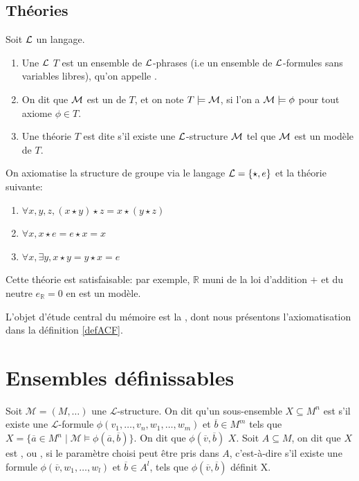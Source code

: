 \subsection{Théories}

\begin{defi}
Soit $\mathcal{L}$ un langage.
\begin{enumerate}
\item Une $\mathcal{L}$ $T$ est un ensemble de $\mathcal{L}$-phrases (i.e un ensemble de $\mathcal{L}$-formules sans variables libres), qu'on appelle .
\item On dit que $\mathcal{M}$ est un  de $T$, et on note $T \models \mathcal{M}$, si l'on a $\mathcal{M} \models \phi$ pour tout axiome $\phi \in T$.
\item Une théorie $T$ est dite  s'il existe une $\mathcal{L}$-structure $\mathcal{M}$ tel que $\mathcal{M}$ est un modèle de $T$.
\end{enumerate}
\end{defi}

\begin{exem}
On axiomatise la structure de groupe via le langage $\mathcal{L} = \{ \star , e \}$ et la théorie suivante:
\begin{enumerate}
\item $\forall x,y,z, (x \star y) \star z = x \star (y \star z)$
\item $\forall x, x \star e = e \star x = x$
\item $\forall x, \exists y, x \star y = y \star x = e$
\end{enumerate}
Cette théorie est satisfaisable: par exemple, $\mathbb{R}$ muni de la loi d'addition $+$ et du neutre $e_{\mathbb{R}} = 0$ en est un modèle.
\end{exem}

\begin{exem}
L'objet d'étude central du mémoire est la ,
dont nous présentons l'axiomatisation dans la définition \ref{defACF}.
\end{exem}

\section{Ensembles définissables}
\begin{defi}
Soit $\mathcal{M} = (M,\dots)$ une $\mathcal{L}$-structure. On dit qu'un sous-ensemble $X \subseteq M^n$ est  s'il existe une 
$\mathcal{L}$-formule $\phi(v_1,\dots,v_n,w_1,\dots,w_m)$ et $\overline{b} \in M^m$ tels que $X= \{ \overline{a} \in M^n \mid \mathcal{M} \models 
\phi(\overline{a},\overline{b}) \}$. On dit que $\phi(\overline{v},\overline{b})$  $X$. Soit $A \subseteq 
M$, on dit que $X$ est , ou , si le paramètre choisi peut être pris dans $A$, c'est-à-dire s'il
existe une formule $\phi(\overline{v},w_1,\dots,w_l)$ et $\overline{b} \in A^l$, tels que $\phi(\overline{v},\overline{b})$ définit X.
\end{defi}

